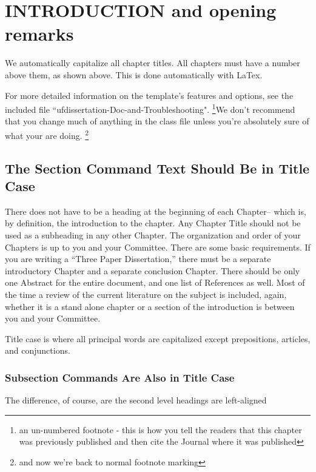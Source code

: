 \chapter{INTRODUCTION and opening remarks} \label{intro}

We automatically capitalize all chapter titles. All chapters must have a number above them, as shown above. This is done automatically with LaTex. 

For more detailed information on the template's features and options, see the included file ``ufdissertation-Doc-and-Troubleshooting".
\renewcommand*{\thefootnote}{\fnsymbol{footnote}}{\footnote{an un-numbered footnote - this is how you tell the readers that this chapter was previously published and then cite the Journal where it was published}}We don't recommend that you change much of anything in the class file unless you're absolutely sure of what your are doing.
\renewcommand*{\thefootnote}{\arabic{footnote}}\setcounter{footnote}{0}\footnote{and now we're back to normal footnote marking} 

\section{The Section Command Text Should Be in Title Case}

 There does not have to be a heading at the beginning of each Chapter– which is, by definition, the introduction to the chapter. Any Chapter Title should not be used as a subheading in any other Chapter. The organization and order of your Chapters is up to you and your Committee. There are some basic requirements. If you are writing a “Three Paper Dissertation,” there must be a separate introductory Chapter and a separate conclusion Chapter. There should be only one Abstract for the entire document, and one list of References as well. Most of the time a review of the current literature on the subject is included, again, whether it is a stand alone chapter or a section of the introduction is between you and your Committee.

Title case is where all principal words are capitalized except prepositions, articles, and conjunctions.  %

\subsection{Subsection Commands Are Also in Title Case}
The difference, of course, are the second level headings are left-aligned

